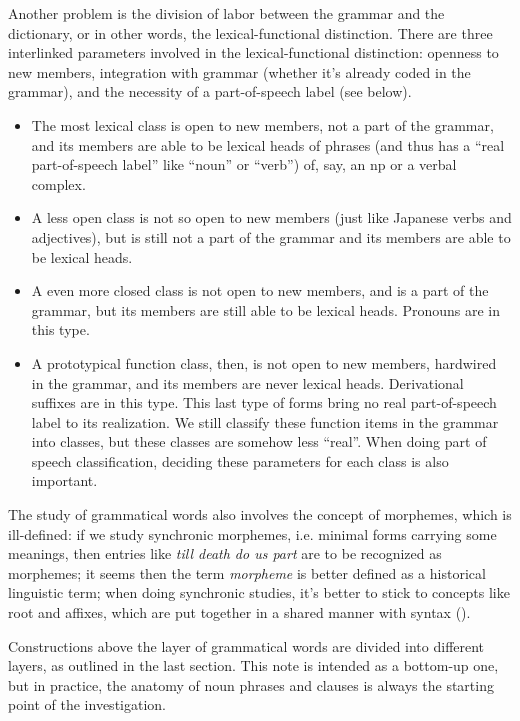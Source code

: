 \documentclass[UTF8, a4paper, oneside, scheme=plain, 12pt]{ctexrep}
\newcommand*{\term}[1]{\emph{#1}}
\newcommand{\form}[1]{\emph{#1}}
\begin{document}
{Another problem is the division of labor 
between the grammar and the dictionary, 
or in other words, the lexical-functional distinction. 
There are three interlinked parameters involved in the lexical-functional distinction:
openness to new members, 
integration with grammar (whether it's already coded in the grammar),
and the necessity of a part-of-speech label (see below).
\begin{itemize}
    \item The most lexical class is open to new members, 
    not a part of the grammar,
    and its members are able to be lexical heads of phrases
    (and thus has a ``real part-of-speech label'' 
    like ``noun'' or ``verb'') 
    of, say, an \acs{np} or a verbal complex.
    \item A less open class is not so open to new members 
    (just like Japanese verbs and adjectives),
    but is still not a part of the grammar 
    and its members are able to be lexical heads. 
    \item A even more closed class is not open to new members,
    and is a part of the grammar,
    but its members are still able to be lexical heads.
    Pronouns are in this type.
    \item A prototypical function class, then, 
    is not open to new members, hardwired in the grammar, 
    and its members are never lexical heads.
    Derivational suffixes are in this type.
    This last type of forms 
    bring no real part-of-speech label to its realization.
    We still classify these function items in the grammar into classes,
    but these classes are somehow less ``real''.
    When doing part of speech classification,
    deciding these parameters for each class 
    is also important.
\end{itemize}

The study of grammatical words 
also involves the concept of morphemes, 
which is ill-defined:
if we study synchronic morphemes, 
i.e. minimal forms carrying some meanings, 
then entries like \form{till death do us part} 
are to be recognized as morphemes; 
it seems then the term \term{morpheme} is better defined 
as a historical linguistic term; 
when doing synchronic studies, 
it's better to stick to concepts like root and affixes, 
which are put together in a shared manner with syntax
().

Constructions above the layer of grammatical words
are divided into different layers, as outlined in the last section. 
This note is intended as a bottom-up one, 
but in practice, the anatomy of noun phrases and clauses 
is always the starting point of the investigation. 

}
\end{document}
